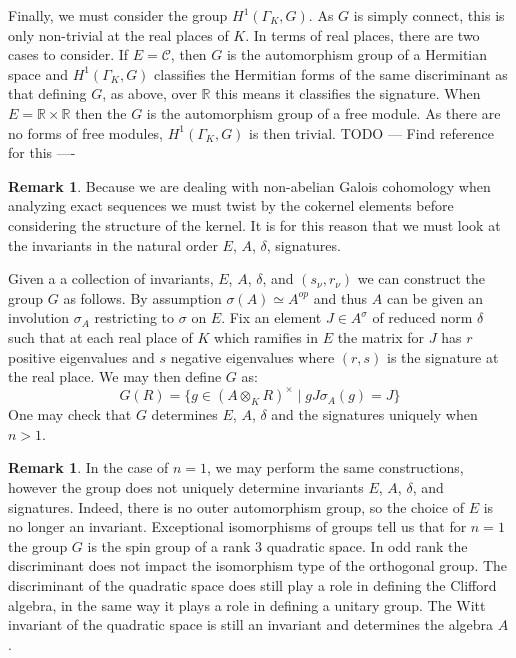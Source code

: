 \documentclass{article}
\theoremstyle{plain}
\theoremstyle{definition}
\newtheorem{remark}[theorem]{Remark}
\newcommand{\C}{\mathcal{C}}
\newcommand{\RR}{\mathbb{R}}
\newcommand{\GalKbK}{\Gamma_K}
\begin{document}
\begin{itemize}
Finally, we must consider the group $H^1(\GalKbK,G)$. As $G$ is simply connect, this is only non-trivial at the real places of $K$.
In terms of real places, there are two cases to consider.
If $E=\C$, then $G$ is the automorphism group of a Hermitian space and $H^1(\GalKbK,G)$ classifies the Hermitian forms of the same discriminant as that defining $G$, as above, over $\RR$ this means it classifies the signature.
When $E=\RR\times\RR$ then the $G$ is the automorphism group of a free module.
 As there are no forms of free modules, $H^1(\GalKbK,G)$ is then trivial. 
TODO --- Find reference for this ----





\begin{remark}
Because we are dealing with non-abelian Galois cohomology when analyzing exact sequences we must twist by the cokernel elements before considering the structure of the kernel. It is for this reason that we must look at the invariants in the natural order $E$, $A$, $\delta$, signatures.
\end{remark}

Given a a collection of invariants, $E$, $A$, $\delta$, and $(s_\nu,r_\nu)$ we can construct the group $G$ as follows.
By assumption $\sigma(A) \simeq A^{op}$ and thus $A$ can be given an involution $\sigma_A$ restricting to $\sigma$ on $E$.
Fix an element $J \in A^\sigma$ of reduced norm $\delta$ such that at each real place of $K$ which ramifies in $E$ the matrix for $J$ has $r$ positive eigenvalues and $s$ negative eigenvalues where $(r,s)$ is the signature at the real place. We may then define $G$ as:
\[ G(R) = \{ g \in (A\otimes_K R)^\times \mid gJ\sigma_A(g) = J \} \]
One may check that $G$ determines $E$, $A$, $\delta$ and the signatures uniquely when $n>1$.

\begin{remark}
In the case of $n=1$, we may perform the same constructions, however the group does not uniquely determine invariants $E$, $A$, $\delta$, and signatures.
Indeed, there is no outer automorphism group, so the choice of $E$ is no longer an invariant.
Exceptional isomorphisms of groups tell us that for $n=1$ the group $G$ is the spin group of a rank $3$ quadratic space.
In odd rank the discriminant does not impact the isomorphism type of the orthogonal group.
The discriminant of the quadratic space does still play a role in defining the Clifford algebra, in the same way it plays a role in defining a unitary group. The Witt invariant of the quadratic space is still an invariant and determines the algebra $A$.


\end{remark}
\end{itemize}
\end{document}
